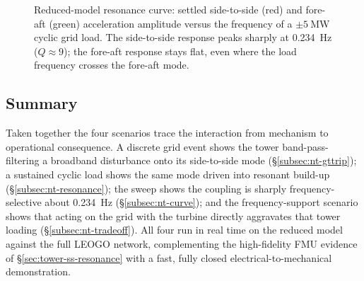 \begin{figure}[t]
  \centering
  \caption{Reduced-model resonance curve: settled side-to-side (red) and fore-aft
  (green) acceleration amplitude versus the frequency of a \(\pm\SI{5}{\mega\watt}\)
  cyclic grid load. The side-to-side response peaks sharply at \SI{0.234}{\hertz}
  (\(Q\approx 9\)); the fore-aft response stays flat, even where the load
  frequency crosses the fore-aft mode.}
  \label{fig:nt-curve}
\end{figure}

\subsection{Summary}
\label{subsec:nt-summary}

Taken together the four scenarios trace the interaction from mechanism to
operational consequence. A discrete grid event shows the tower band-pass-filtering
a broadband disturbance onto its side-to-side mode
(\S\ref{subsec:nt-gttrip}); a sustained cyclic load shows the same mode driven
into resonant build-up (\S\ref{subsec:nt-resonance}); the sweep shows the coupling
is sharply frequency-selective about \SI{0.234}{\hertz} (\S\ref{subsec:nt-curve});
and the frequency-support scenario shows that acting on the grid with the turbine
directly aggravates that tower loading (\S\ref{subsec:nt-tradeoff}). All four run
in real time on the reduced model against the full LEOGO network, complementing
the high-fidelity FMU evidence of \S\ref{sec:tower-ss-resonance} with a fast,
fully closed electrical-to-mechanical demonstration.
